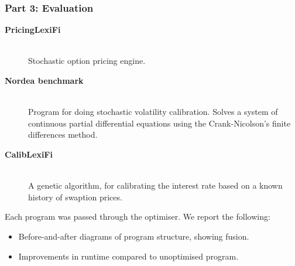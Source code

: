\documentclass[rgb,dvipsnames]{beamer}
\begin{document}
\begin{frame}
  \frametitle{Part 3: Evaluation}

\begin{description}
\item[\bf PricingLexiFi]\hfill\\ Stochastic option pricing engine.

\item[\bf Nordea benchmark]\hfill\\ Program for doing stochastic volatility
  calibration.  Solves a system of continuous partial differential
  equations using the Crank-Nicolson's finite differences method.

\item[\bf CalibLexiFi]\hfill\\ A genetic algorithm, for calibrating the interest
  rate based on a known history of swaption prices.
\end{description}

Each program was passed through the optimiser.  We report the
following:

\begin{itemize}
\item Before-and-after diagrams of program structure, showing fusion.
\item Improvements in runtime compared to unoptimised program.
\end{itemize}
\end{frame}
\end{document}
